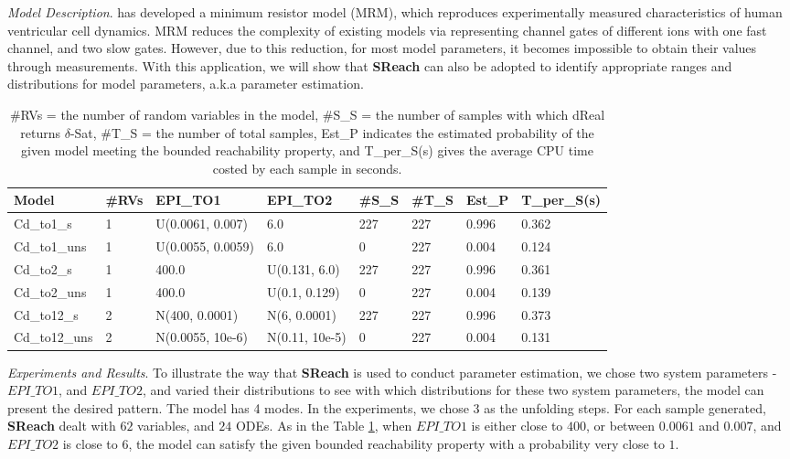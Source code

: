 \textit{Model Description}.
\cite{bueno2008minimal} has developed a minimum resistor model (MRM), which reproduces experimentally measured characteristics of human ventricular cell dynamics. MRM reduces the complexity of existing models via representing channel gates of different ions with one fast channel, and two slow gates. However, due to this reduction, for most model parameters, it becomes impossible to obtain their values through measurements. With this application, we will show that {\bf SReach} can also be adopted to identify appropriate ranges and distributions for model parameters, a.k.a parameter estimation.
\begin{table}[h]
\centering
    \begin{tabular}{|l|l|l|l|l|l|l|l|}
    \hline
    Model         & \#RVs & EPI\_TO1            & EPI\_TO2         & \#S\_S & \#T\_S & Est\_P & T\_per\_S(s) \\ \hline
    Cd\_to1\_s    & 1     & U(0.0061, 0.007)    & 6.0              & 227       & 227      & 0.996     & 0.362        \\ \hline
    Cd\_to1\_uns  & 1     & U(0.0055, 0.0059)   & 6.0              & 0         & 227      & 0.004     & 0.124        \\ \hline
    Cd\_to2\_s    & 1     & 400.0               & U(0.131, 6.0)    & 227       & 227      & 0.996     & 0.361        \\ \hline
    Cd\_to2\_uns  & 1     & 400.0               & U(0.1, 0.129)    & 0         & 227      & 0.004     & 0.139        \\ \hline
    Cd\_to12\_s   & 2     & N(400, 0.0001)      & N(6, 0.0001)     & 227       & 227      & 0.996     & 0.373        \\ \hline
    Cd\_to12\_uns & 2     & N(0.0055, 10e-6) & N(0.11, 10e-5) & 0         & 227      & 0.004     & 0.131        \\ \hline
    \end{tabular}
    \caption { \#RVs = the number of random variables in the model, \#S\_S = the number of samples with which dReal returns $\delta$-Sat, \#T\_S = the number of total samples, Est\_P indicates the estimated probability of the given model meeting the bounded reachability property, and T\_per\_S(s) gives the average CPU time costed by each sample in seconds.}
    \label{table:cardiac}
\end{table}

\textit{Experiments and Results}. To illustrate the way that {\bf SReach} is used to conduct parameter estimation, we chose two system parameters - $EPI\_TO1$, and $EPI\_TO2$, and varied their distributions to see with which distributions for these two system parameters, the model can present the desired pattern. The model has 4 modes. In the experiments, we chose $3$ as the unfolding steps. For each sample generated, {\bf SReach} dealt with $62$ variables, and $24$ ODEs. As in the Table \ref{table:cardiac}, when $EPI\_TO1$ is either close to $400$, or between $0.0061$ and $0.007$, and $EPI\_TO2$ is close to $6$, the model can satisfy the given bounded reachability property with a probability very close to $1$. 

